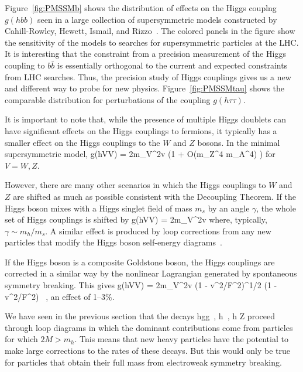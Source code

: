 \documentclass[12pt]{article}
\begin{document}
Figure~\ref{fig:PMSSMb}  shows the distribution of effects on the
Higgs couplng $g(hbb)$ seen in a large collection of supersymmetric
models constructed by Cahill-Rowley, Hewett, Ismail, and Rizzo~\cite{PMSSM}.   The
colored panels in the figure show the sensitivity of the models to 
searches for supersymmetric particles at the LHC.  It is interesting
that the constraint from a precision measurement of the Higgs coupling
to $b\bar b$ is essentially orthogonal to the current and expected
constraints from LHC searches.   Thus, the precision study of Higgs
couplings gives us a new and different way to probe for new physics.
Figure~\ref{fig:PMSSMtau} shows the comparable distribution for
perturbations of the coupling $g(h\tau\tau)$. 

It is important to note that, while the presence of multiple Higgs
doublets can have significant effects on the Higgs couplings to
fermions, it typically has a smaller effect on the Higgs couplings to
the $W$ and $Z$ bosons.  In the minimal supersymmetric model,
\beq
         g(hVV) =  { 2m_V^2\over v} \cdot \bigl(1 + {\cal O}({m_Z^4\over
         m_A^4})   \bigr)
\eeqn
for $V = W,Z$. 

However, there are many other scenarios in which the Higgs couplings
to $W$ and $Z$ are shifted as much as possible consistent with the
Decoupling
Theorem.    If the Higgs boson mixes with a Higgs singlet field of
mass $m_s$ by an 
angle $\gamma$, the
whole set of Higgs couplings is shifted by 
\beq
           g(hVV)  =   { 2m_V^2\over v} \cdot \cos \gamma 
\eeqn
where, typically, $\gamma \sim  m_h/m_s$.   A similar effect is produced
by loop corrections from any new particles that modify the Higgs boson 
self-energy diagrams~\cite{HanCH,CraigMcCullough}.

If the Higgs boson is a composite Goldstone boson, the Higgs couplings
are corrected in a similar way by the nonlinear Lagrangian generated
by spontaneous symmetry breaking.  This gives
\beq
           g(hVV)  =   { 2m_V^2\over v} \cdot (1 - v^2/F^2)^{1/2}
            \cdot (1 -\half  v^2/F^2) \ , 
\eeqn
an effect of 1--3\%. 

We have seen in the previous section that the decays
\beq
   h\to gg\ , \quad  h\to \gamma\gamma\ , \quad h \to \gamma Z 
\eeqn
proceed through loop diagrams in which the dominant contributions come
from particles for which $2M > m_h$.   Tnis means that new heavy
particles have the potential to make large corrections to the rates of
these
decays.  But this would only be true for particles that obtain their
full
mass from electroweak symmetry breaking. 
\end{document}
